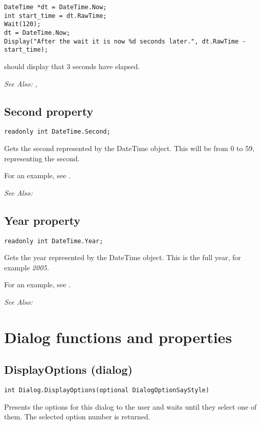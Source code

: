 \begin{verbatim}
DateTime *dt = DateTime.Now;
int start_time = dt.RawTime;
Wait(120);
dt = DateTime.Now;
Display("After the wait it is now %d seconds later.", dt.RawTime - start_time);
\end{verbatim}
should display that 3 seconds have elapsed.

\it{See Also:} , 


\subsection{Second property}\label{DateTime.Second}%

\begin{verbatim}
readonly int DateTime.Second;
\end{verbatim}
Gets the second represented by the DateTime object. This will be from 0 to 59,
representing the second.

For an example, see .

\it{See Also:} 


\subsection{Year property}\label{DateTime.Year}%

\begin{verbatim}
readonly int DateTime.Year;
\end{verbatim}
Gets the year represented by the DateTime object. This is the full year,
for example \it{2005}.

For an example, see .

\it{See Also:} 


\section{Dialog functions and properties}%


\subsection{DisplayOptions (dialog)}\label{Dialog.DisplayOptions}%

\begin{verbatim}
int Dialog.DisplayOptions(optional DialogOptionSayStyle)
\end{verbatim}
Presents the options for this dialog to the user and waits until they select
one of them. The selected option number is returned.

